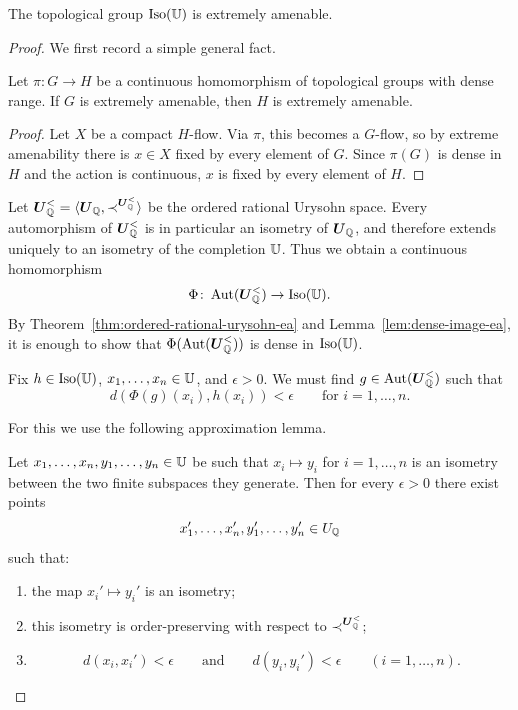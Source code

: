 \begin{theorem}[Pestov]
    \label{thm:pestov-urysohn}
    The topological group \(\operatorname{Iso}(\mathbb{U})\) is extremely amenable.
\end{theorem}

\begin{proof}
    We first record a simple general fact.

    \begin{lemma}
        \label{lem:dense-image-ea}
        Let \(\pi\colon G\to H\) be a continuous homomorphism of topological groups with dense range. If \(G\) is extremely amenable, then \(H\) is extremely amenable.
    \end{lemma}

    \begin{proof}
        Let \(X\) be a compact \(H\)-flow. Via \(\pi\), this becomes a \(G\)-flow, so by extreme amenability there is \(x\in X\) fixed by every element of \(G\). Since \(\pi(G)\) is dense in \(H\) and the action is continuous, \(x\) is fixed by every element of \(H\).
    \end{proof}

    Let \(\boldsymbol{U}_{\mathbb{Q}}^{<}=\langle \boldsymbol{U}_{\mathbb{Q}},\prec^{\boldsymbol{U}_{\mathbb{Q}}^{<}}\rangle\) be the ordered rational Urysohn space. Every automorphism of \(\boldsymbol{U}_{\mathbb{Q}}^{<}\) is in particular an isometry of \(\boldsymbol{U}_{\mathbb{Q}}\), and therefore extends uniquely to an isometry of the completion \(\mathbb{U}\). Thus we obtain a continuous homomorphism
    \[
        \Phi\colon \operatorname{Aut}(\boldsymbol{U}_{\mathbb{Q}}^{<})\to \operatorname{Iso}(\mathbb{U}).
    \]
    By Theorem~\ref{thm:ordered-rational-urysohn-ea} and Lemma~\ref{lem:dense-image-ea}, it is enough to show that \(\Phi(\operatorname{Aut}(\boldsymbol{U}_{\mathbb{Q}}^{<}))\) is dense in \(\operatorname{Iso}(\mathbb{U})\).

    Fix \(h\in \operatorname{Iso}(\mathbb{U})\), \(x_1,\dots,x_n\in \mathbb{U}\), and \(\epsilon>0\). We must find \(g\in \operatorname{Aut}(\boldsymbol{U}_{\mathbb{Q}}^{<})\) such that
    \[
        d(\Phi(g)(x_i),h(x_i))<\epsilon
        \qquad\text{for } i=1,\dots,n.
    \]

    For this we use the following approximation lemma.

    \begin{lemma}
        \label{lem:ordered-rational-approximation}
        Let \(x_1,\dots,x_n,y_1,\dots,y_n\in \mathbb{U}\) be such that \(x_i\mapsto y_i\) for \(i=1,\dots,n\) is an isometry between the two finite subspaces they generate. Then for every \(\epsilon>0\) there exist points
        \[
            x_1',\dots,x_n',y_1',\dots,y_n'\in U_{\mathbb{Q}}
        \]
        such that:
        \begin{enumerate}
            \item[(i)] the map \(x_i'\mapsto y_i'\) is an isometry;
            \item[(ii)] this isometry is order-preserving with respect to \(\prec^{\boldsymbol{U}_{\mathbb{Q}}^{<}}\);
            \item[(iii)]
                  \[
                      d(x_i,x_i')<\epsilon
                      \qquad\text{and}\qquad
                      d(y_i,y_i')<\epsilon
                      \qquad (i=1,\dots,n).
                  \]
        \end{enumerate}
    \end{lemma}


\end{proof}
